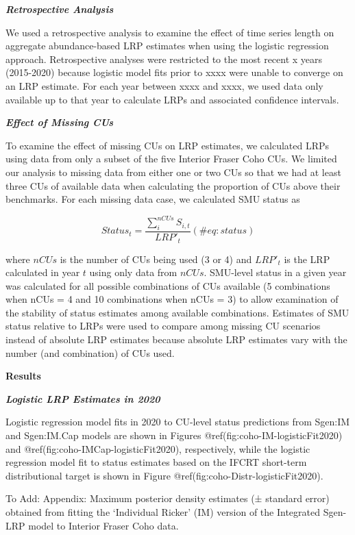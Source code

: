 \documentclass[
]{article}
\begin{document}
\textbf{\emph{Retrospective Analysis}}

We used a retrospective analysis to examine the effect of time series
length on aggregate abundance-based LRP estimates when using the
logistic regression approach. Retrospective analyses were restricted to
the most recent x years (2015-2020) because logistic model fits prior to
xxxx were unable to converge on an LRP estimate. For each year between
xxxx and xxxx, we used data only available up to that year to calculate
LRPs and associated confidence intervals.

\textbf{\emph{Effect of Missing CUs}}

To examine the effect of missing CUs on LRP estimates, we calculated
LRPs using data from only a subset of the five Interior Fraser Coho CUs.
We limited our analysis to missing data from either one or two CUs so
that we had at least three CUs of available data when calculating the
proportion of CUs above their benchmarks. For each missing data case, we
calculated SMU status as

\begin{equation}
  Status_t = \frac{\sum_{i}^{nCUs} S_{i,t}}{LRP'_t}
   (\#eq:status)
\end{equation}

where \(nCUs\) is the number of CUs being used (3 or 4) and \(LRP'_t\)
is the LRP calculated in year \(t\) using only data from \(nCUs\).
SMU-level status in a given year was calculated for all possible
combinations of CUs available (5 combinations when nCUs = 4 and 10
combinations when nCUs = 3) to allow examination of the stability of
status estimates among available combinations. Estimates of SMU status
relative to LRPs were used to compare among missing CU scenarios instead
of absolute LRP estimates because absolute LRP estimates vary with the
number (and combination) of CUs used.

\textbf{Results}

\textbf{\emph{Logistic LRP Estimates in 2020}}

Logistic regression model fits in 2020 to CU-level status predictions
from Sgen:IM and Sgen:IM.Cap models are shown in Figures
@ref(fig:coho-IM-logisticFit2020) and
@ref(fig:coho-IMCap-logisticFit2020), respectively, while the logistic
regression model fit to status estimates based on the IFCRT short-term
distributional target is shown in Figure
@ref(fig:coho-Distr-logisticFit2020).

To Add: Appendix: Maximum posterior density estimates (± standard error)
obtained from fitting the `Individual Ricker' (IM) version of the
Integrated Sgen-LRP model to Interior Fraser Coho data.
\end{document}
